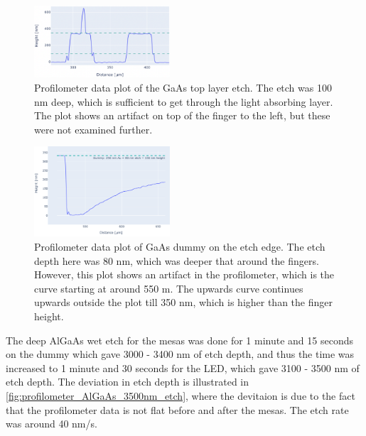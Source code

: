 \begin{figure}[ht]
    \centering
    \includegraphics[width=0.45\textwidth]{figures/LED_GaAs_100nm_etch.png}
    \caption{
        Profilometer data plot of the GaAs top layer etch. 
        The etch was 100 nm deep, which is sufficient to get through the light absorbing layer.
        The plot shows an artifact on top of the finger to the left, but these were not examined further.
    }
    \label{fig:profilometer_GaAs_100nm_etch}
\end{figure}

\begin{figure}[ht]
    \centering
    \includegraphics[width=0.45\textwidth]{figures/Dummy_GaAs_80nm_etch_lost_contact.png}
    \caption{
        Profilometer data plot of GaAs dummy on the etch edge. 
        The etch depth here was 80 nm, which was deeper that around the fingers. 
        However, this plot shows an artifact in the profilometer, which is the curve starting at around 550 \textmu m.
        The upwards curve continues upwards outside the plot till 350 nm, which is higher than the finger height.
    }
    \label{fig:Dummy_GaAs_80nm_etch_lost_contact}
\end{figure}



The deep AlGaAs wet etch for the mesas was done for 1 minute and 15 seconds on the dummy which gave 3000 - 3400 nm of etch depth, and thus the time was increased to 1 minute and 30 seconds for the LED, which gave 3100 - 3500 nm of etch depth. 
The deviation in etch depth is illustrated in \autoref{fig:profilometer_AlGaAs_3500nm_etch}, where the devitaion is due to the fact that the profilometer data is not flat before and after the mesas. 
The etch rate was around 40 nm/s.

